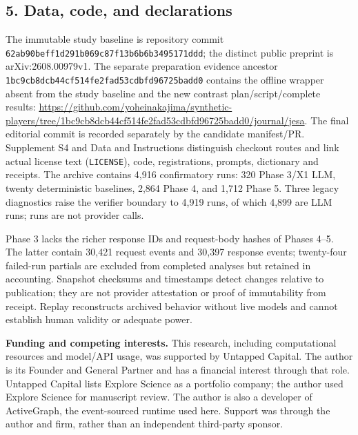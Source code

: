 \documentclass[11pt]{article}
\begin{document}
\subsection{5. Data, code, and
declarations}\label{data-code-and-declarations}

The immutable study baseline is repository commit
\nolinkurl{62ab90beff1d291b069c87f13b6b6b3495171ddd}; the distinct
public preprint is arXiv:2608.00979v1. The separate preparation evidence
ancestor \nolinkurl{1bc9cb8dcb44cf514fe2fad53cdbfd96725badd0} contains
the offline wrapper absent from the study baseline and the new contrast
plan/script/complete results:
\url{https://github.com/yoheinakajima/synthetic-players/tree/1bc9cb8dcb44cf514fe2fad53cdbfd96725badd0/journal/jesa}.
The final editorial commit is recorded separately by the candidate
manifest/PR. Supplement S4 and Data and Instructions distinguish
checkout routes and link actual license text (\texttt{LICENSE}), code,
registrations, prompts, dictionary and receipts. The archive contains
4,916 confirmatory runs: 320 Phase 3/X1 LLM, twenty deterministic
baselines, 2,864 Phase 4, and 1,712 Phase 5. Three legacy diagnostics
raise the verifier boundary to 4,919 runs, of which 4,899 are LLM runs;
runs are not provider calls.

Phase 3 lacks the richer response IDs and request-body hashes of Phases
4--5. The latter contain 30,421 request events and 30,397 response
events; twenty-four failed-run partials are excluded from completed
analyses but retained in accounting. Snapshot checksums and timestamps
detect changes relative to publication; they are not provider
attestation or proof of immutability from receipt. Replay reconstructs
archived behavior without live models and cannot establish human
validity or adequate power.

\textbf{Funding and competing interests.} This research, including
computational resources and model/API usage, was supported by Untapped
Capital. The author is its Founder and General Partner and has a
financial interest through that role. Untapped Capital lists Explore
Science as a portfolio company; the author used Explore Science for
manuscript review. The author is also a developer of ActiveGraph, the
event-sourced runtime used here. Support was through the author and
firm, rather than an independent third-party sponsor.
\end{document}
